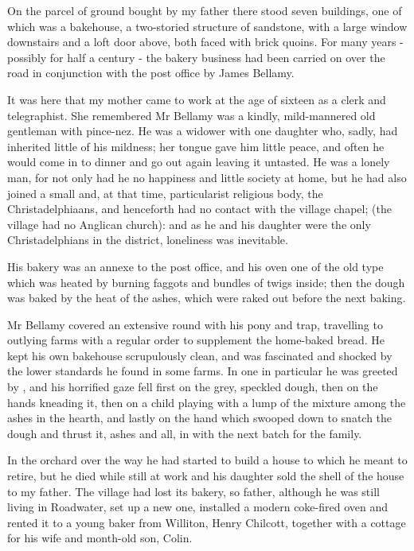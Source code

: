 
On the parcel of ground bought by my father there stood seven buildings, one of which was a bakehouse, a two-storied structure of sandstone, with a large window downstairs and a loft door above, both faced with brick quoins. For many years - possibly for half a century - the bakery business had been carried on over the road in conjunction with the post office by James Bellamy.

It was here that my mother came to work at the age of sixteen as a clerk and telegraphist. She remembered Mr Bellamy was a kindly, mild-mannered old gentleman with pince-nez. He was a widower with one daughter who, sadly, had inherited little of his mildness; her tongue gave him little peace, and often he would come in to dinner and go out again leaving it untasted. He was a lonely man, for not only had he no happiness and little society at home, but he had also joined a small and, at that time, particularist religious body, the Christadelphiaans, and henceforth had no contact with the village chapel; (the village had no Anglican church): and as he and his daughter were the only Christadelphians in the district, loneliness was inevitable.

His bakery was an annexe to the post office, and his oven one of the old type which was heated by burning faggots and bundles of twigs inside; then the dough was baked by the heat of the ashes, which were raked out before the next baking.

Mr Bellamy covered an extensive round with his pony and trap, travelling to outlying farms with a regular order to supplement the home-baked bread. He kept his own bakehouse scrupulously clean, and was fascinated and shocked by the lower standards he found in some farms. In one in particular he was greeted by , and his horrified gaze fell first on the grey, speckled dough, then on the hands kneading it, then on a child playing with a lump of the mixture among the ashes in the hearth, and lastly on the hand which swooped down to snatch the dough and thrust it, ashes and all, in with the next batch for the family.

In the orchard over the way he had started to build a house to which he meant to retire, but he died while still at work and his daughter sold the shell of the house to my father. The village had lost its bakery, so father, although he was still living in Roadwater, set up a new one, installed a modern coke-fired oven and rented it to a young baker from Williton, Henry Chilcott, together with a cottage for his wife and month-old son, Colin.

